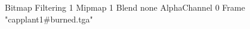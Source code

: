 {Bitmap
	{Filtering 1}
	{Mipmap 1}
	{Blend none}
	{AlphaChannel 0}
	{Frame "capplant1#burned.tga"}
}
